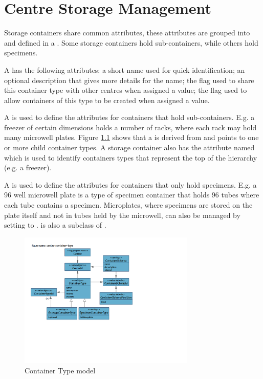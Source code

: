 \chapter{Centre Storage Management}
\label{chap:centre-storage-management}
Storage containers share common attributes, these attributes are grouped into
and defined in a . Some storage containers hold
sub-containers, while others hold specimens.

A  has the following attributes: a short name used
for quick identification; an optional description that gives more details for
the name; the  flag used to share this container type with
other centres when assigned a  value; the 
flag used to allow containers of this type to be created when assigned a
 value.

A  is used to define the attributes for
containers that hold sub-containers. E.g. a freezer of certain dimensions holds
a number of racks, where each rack may hold many microwell plates. Figure
\ref{fig:centre-container-type} shows that a 
is derived from  and points to one or more child
container types. A storage container also has the attribute named
 which is used to identify containers types that represent
the top of the hierarchy (e.g. a freezer).

A  is used to define the attributes for containers that only
hold specimens. E.g. a 96 well microwell plate is a type of specimen container that holds 96 tubes
where each tube contains a specimen. Microplates, where specimens are stored on the plate itself and
not in tubes held by the microwell, can also be managed by setting  to
.  is also a subclass of
.

\begin{figure}[H]
  \centering
  \includegraphics[trim={10mm 73mm 92mm 18mm}, clip,
    width=0.75\textwidth]{images/centre-container-type}
  \caption{Container Type model}
  \label{fig:centre-container-type}
\end{figure}

